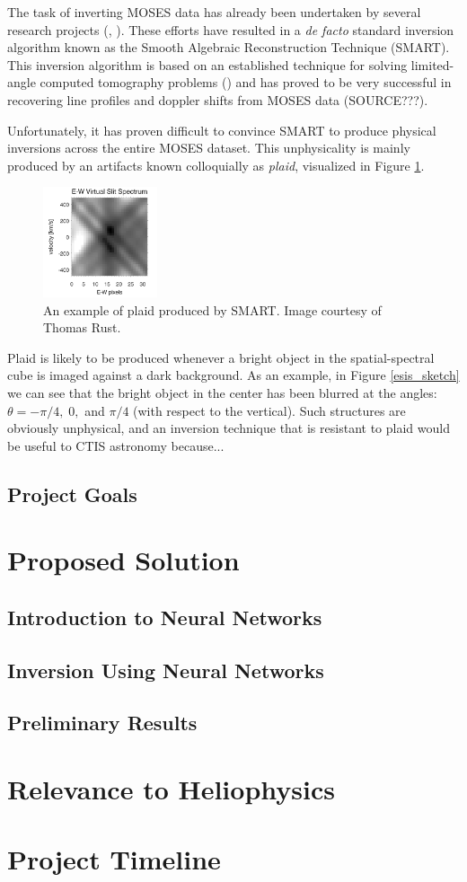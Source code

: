 \documentclass{article}
\begin{document}
			The task of inverting MOSES data has already been undertaken by several research projects (\cite{inversion}, \cite{fox1}). These efforts have resulted in a \textit{de facto} standard inversion algorithm known as the Smooth Algebraic Reconstruction Technique (SMART). This inversion algorithm is based on an established technique for solving limited-angle computed tomography problems (\cite{Gordon70}) and has proved to be very successful in recovering line profiles and doppler shifts from MOSES data (SOURCE???).
			
			Unfortunately, it has proven difficult to convince SMART to produce physical inversions across the entire MOSES dataset. This unphysicality is mainly produced by an artifacts known colloquially as \textit{plaid}, visualized in Figure \ref{plaid}.
			\begin{figure}[h!]
				\centering
				\includegraphics[width=0.3\textwidth]{figures/plaid}
				\caption{An example of plaid produced by SMART. Image courtesy of Thomas Rust.}
				\label{plaid}
			\end{figure}
			Plaid is likely to be produced whenever a bright object in the spatial-spectral cube is imaged against a dark background. As an example, in Figure \ref{esis_sketch} we can see that the bright object in the center has been blurred at the angles: $\theta=-\pi/4, \; 0,$ and $\pi/4$ (with respect to the vertical). Such structures are obviously unphysical, and an inversion technique that is resistant to plaid would be useful to CTIS astronomy because...
		\subsection{Project Goals}
	\section{Proposed Solution}
		\label{prop_sol}
		\subsection{Introduction to Neural Networks}
		
			
		
		\subsection{Inversion Using Neural Networks}
		\subsection{Preliminary Results}
	\section{Relevance to Heliophysics}
	\section{Project Timeline}
	

	\printbibliography

	
\end{document}
